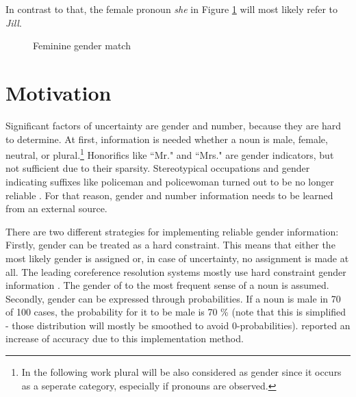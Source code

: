 In contrast to that, the female pronoun \textit{she} in Figure \ref{figure:femmatch} will most likely refer to \textit{Jill}.


\begin{figure}[h]
\centering\sffamily
\caption{Feminine gender match}
	\label{figure:femmatch}
\end{figure}


\section{Motivation}
\label{introductionMotivation}
Significant factors of uncertainty are gender and number, because they are hard to determine. At first, information is needed whether a noun is male, female, neutral, or plural.\footnote{In the following work plural will be also considered as gender since it occurs as a seperate category, especially if pronouns are observed.} Honorifics like “Mr." and “Mrs." are gender indicators, but not sufficient due to their sparsity. Stereotypical occupations and gender indicating suffixes like policeman and policewoman turned out to be no longer reliable \citep{evans2000improving}. For that reason, gender and number information needs to be learned from an external source. 

There are two different strategies for implementing reliable gender information: \\
Firstly, gender can be treated as a hard constraint. This means that either the most likely gender is assigned or, in case of uncertainty, no assignment is made at all. The leading coreference resolution systems mostly use hard constraint gender information \citep{soon2001machine}. The gender of to the most frequent sense of a noun is assumed.\\
Secondly, gender can be expressed through probabilities. If a noun is male in 70 of 100 cases, the probability for it to be male is 70 \% (note that this is simplified - those distribution will mostly be smoothed to avoid 0-probabilities). \cite{bergsma2005automatic} reported an increase of accuracy due to this implementation method.

